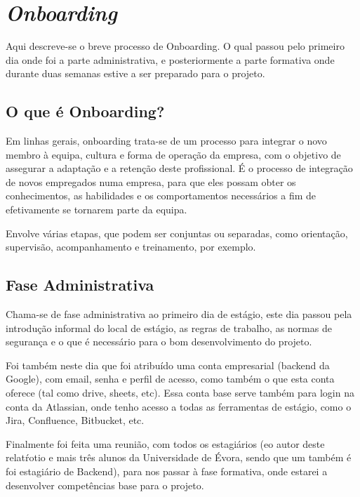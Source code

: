 \chapter{\textit{Onboarding}}\label{cap3}

Aqui descreve-se o breve processo de Onboarding. O qual passou pelo primeiro dia onde foi a parte administrativa, e posteriormente a parte formativa onde durante duas semanas estive a ser preparado para o projeto.

\section{O que é Onboarding?}

Em linhas gerais, onboarding trata-se de um processo para integrar o novo membro à equipa, cultura e forma de operação da empresa, com o objetivo de assegurar a adaptação e a retenção deste profissional. É o processo de integração de novos empregados numa empresa, para que eles possam obter os conhecimentos, as habilidades e os comportamentos necessários a fim de efetivamente se tornarem parte da equipa.

Envolve várias etapas, que podem ser conjuntas ou separadas, como orientação, supervisão, acompanhamento e treinamento, por exemplo.

\section{Fase Administrativa}

Chama-se de fase administrativa ao primeiro dia de estágio, este dia passou pela introdução informal do local de estágio, as regras de trabalho, as normas de segurança e o que é necessário para o bom desenvolvimento do projeto.

Foi também neste dia que foi atribuído uma conta empresarial (backend da Google), com email, senha e perfil de acesso, como também o que esta conta oferece (tal como drive, sheets, etc). Essa conta base serve também para login na conta da Atlassian, onde tenho acesso a todas as ferramentas de estágio, como o Jira, Confluence, Bitbucket, etc.

Finalmente foi feita uma reunião, com todos os estagiários (eo autor deste relatŕotio e mais três alunos da Universidade de Évora, sendo que um também é foi estagiário de Backend), para nos passar à fase formativa, onde estarei a desenvolver competências base para o projeto.

\newpage

